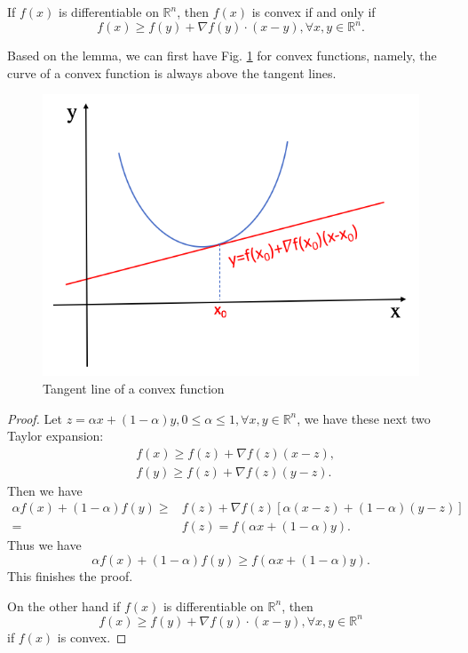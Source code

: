 \begin{lemma}
	If $f(x)$ is differentiable on $\mathbb{R}^n$, then $f(x)$ is convex if and only if
	\begin{equation}
	f( x) \ge f( y) + \nabla f( y)\cdot ( x -  y), \forall x, y \in \mathbb{R}^n.
	\end{equation}
\end{lemma}
Based on the lemma, we can first have  Fig. \ref{fig:convextangent} for convex functions, namely, the curve of a convex function is always above the tangent lines.
\begin{figure}[H]
\centering
\includegraphics[width=.5\textwidth] {6DL/figures/convextangent.png}
\caption{Tangent line of a convex function}
\label{fig:convextangent}
\end{figure}

\begin{proof}
	Let $z=\alpha x+(1-\alpha )y, 0\leq \alpha \leq 1, \forall x,y \in \mathbb{R}^n$, we have these next two Taylor expansion:
	\begin{equation}\label{key}
	\begin{aligned}
	&f(x)\geq f(z)+ \nabla f(z)(x-z),\\
	&f(y)\geq f(z)+ \nabla f(z)(y-z).
	\end{aligned}
	\end{equation}
	Then we have
	\begin{equation}
	\begin{aligned}
	\alpha f(x) + (1-\alpha) f(y)
	\geq &f(z) + \nabla f(z)[\alpha(x-z)+(1-\alpha)(y-z)]\\
	=&f(z)
	=f(\alpha x +(1-\alpha)y).
	\end{aligned}
	\end{equation}
	Thus we have
	\begin{equation}\label{key}
	\alpha f(x) + (1-\alpha) f(y) \ge f(\alpha x +(1-\alpha)y).
	\end{equation}
	This finishes the proof.
	
	On the other hand if	$f(x)$ is differentiable on $\mathbb{R}^n$, then 
	$$
	f( x) \ge f( y) + \nabla f( y)\cdot ( x -  y), \forall x, y \in \mathbb{R}^n
	$$ 
	if $f(x)$ is convex.
\end{proof}

